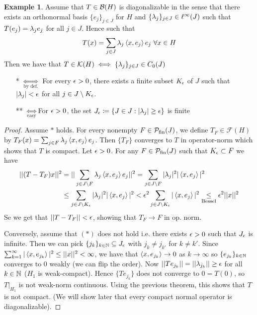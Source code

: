 \documentclass[10pt,english,a4paper]{article}
\theoremstyle{definition}
\newtheorem*{example}{Example}
\def\Psfin{\mathcal{P}_{\textnormal{fin}}}
\def\Ff{\mathcal{F}}
\def\Kf{\mathcal{K}}
\begin{document}
\begin{example}
    Assume that $T \in \mathcal{B}(H)$ is diagonalizable in the sense that there exists 
an orthonormal basis $\{e_j\}_{j \in J}$ for $H$ and $\{\lambda_j\}_{j\in J} \in
\ell^{\infty}(J)$ such that $T(e_j) = \lambda_je_j$ for all $j\in J$. Hence such that 
\[ T(x) = \sum_{j \in J} \lambda_{j}\left\langle x, e_j \right\rangle e_j ~\forall x \in H \]
Then we have that $T \in \Kf(H)\iff \{\la_j\}_{j\in J} \in C_{0}(J)$ 
\begin{itemize}
    \item[*] $\underset{\text{by def.}}{\iff}$ For every $\epsilon >0$, there exists
    a finite subset $K_{\epsilon}$ of $J$ such that $|\lambda_j|<\epsilon$ for all $j\in
    J\setminus K_{\epsilon}$.

    \item[**] $\underset{\text{easy}}{\iff}$For $\epsilon >0$, the set $J_{\epsilon}\coloneqq \{ J \in J : |\lambda_j| \geq \epsilon\}$
    is finite
\end{itemize}
\begin{proof}
   Assume $*$ holds. For every nonempty $F \in \Psfin(J)$, we define $T_F \in \Ff(H)$
by $T_{F}(x) = \sum_{j \in F}\lambda_j\left\langle x,e_j \right\rangle e_j$. Then $\{T_F\}$ converges to 
$T$ in operator-norm which shows that $T$ is compact. Let $\epsilon>0$. For any $F \in \Psfin(J)$
such that $K_{\epsilon} \subset F$ we have 
\begin{align*}
||(T-T_F)x||^2 &= ||\sum_{j\in J\setminus F}\lambda_j\left\langle x,e_j \right\rangle e_j||^2 
= \sum_{j\in J\setminus F} |\lambda_j|^2 |\left\langle x,e_j \right\rangle|^2 \\
&\leq \sum_{j\in J\setminus K_{\epsilon}} |\lambda_j|^2 |\left\langle x,e_j \right\rangle|^2 
< \epsilon^2 \sum_{j \in J\setminus K_{\epsilon}}|\left\langle x,e_j \right\rangle|^2 \underset{\text{Bessel}}{\leq}\epsilon^2 ||x||^2
\end{align*}
Se we get that $||T-T_F|| < \epsilon$, showing that $T_F \to F$ in op. norm. 

Conversely, assume that $(*)$ does not hold i.e. there exists $\epsilon>0$ such that 
$J_{\epsilon}$ is infinite. Then we can pick $\{j_k\}_{k\in \mathbb{N}} \subseteq J_{\epsilon}$
with $j_k \neq j_{k'}$ for $k\neq k'$. Since $\sum_{k=1}^{\infty}
|\left\langle x,e_{j_k} \right\rangle|^2 \leq ||x||^2 <\infty$, we have that $\left\langle x,e_{j_k} \right\rangle \to 0$
as $k\to \infty$ so $\{e_{j_k}\}_{k\in \mathbb{N}}$ converges to 0 weakly (we can flip the order). 
Now $||Te_{j_k}|| = ||\lambda_{j_k}|| \geq \epsilon$ for all $k \in \mathbb{N}$ ($H_1$ is weak-compact). Hence $\{Te_{j_k}\}$
does not converge to $0 = T(0)$, so $T\lvert_{H_1}$ is not weak-norm continuous. 
Using the previous theorem, this shows that $T$ is not compact. (We will show later that 
every compact normal operator is diagonalizable).
\end{proof}
\end{example}
\end{document}
